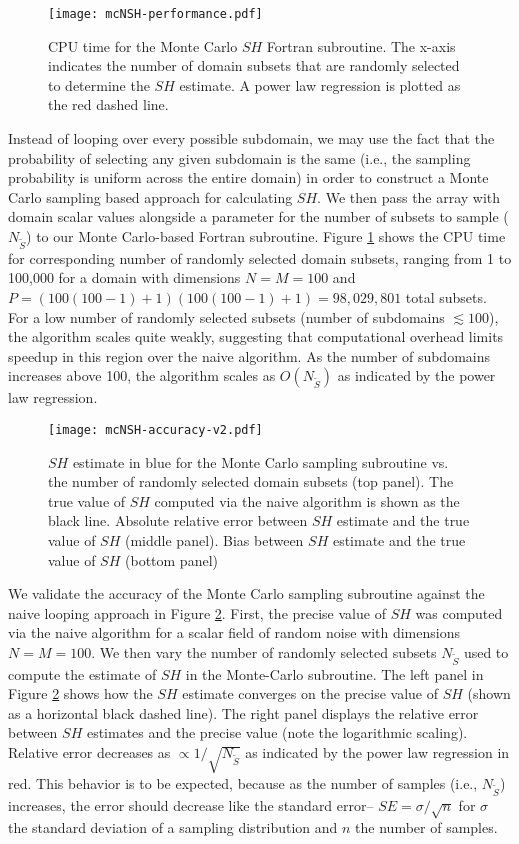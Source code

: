 \begin{figure}[h]
	\centering
	\texttt{[image: mcNSH-performance.pdf]}
	\caption{CPU time for the Monte Carlo $SH$ Fortran subroutine. The x-axis indicates the number of domain subsets that are randomly selected to determine the $SH$ estimate. A power law regression is plotted as the red dashed line.}
	\label{fig:mcsh-performance}
\end{figure}

Instead of looping over every possible subdomain, we may use the fact that the probability of selecting any given subdomain is the same (i.e., the sampling probability is uniform across the entire domain) in order to construct a Monte Carlo sampling based approach for calculating $SH$. We then pass the array with domain scalar values alongside a parameter for the number of subsets to sample ($N_{\tilde{S}}$) to our Monte Carlo-based Fortran subroutine. Figure \ref{fig:mcsh-performance} shows the CPU time for corresponding number of randomly selected domain subsets, ranging from 1 to 100,000 for a domain with dimensions $N=M=100$ and $P=(100(100-1)+1)(100(100-1)+1) = 98,029,801$ total subsets. For a low number of randomly selected subsets (number of subdomains $\lesssim 100$), the algorithm scales quite weakly, suggesting that computational overhead limits speedup in this region over the naive algorithm. As the number of subdomains increases above 100, the algorithm scales as $O(N_{\tilde{S}})$ as indicated by the power law regression.

\begin{figure}[h]
	\centering
	\texttt{[image: mcNSH-accuracy-v2.pdf]}
	\caption{$SH$ estimate in blue for the Monte Carlo sampling subroutine vs. the number of randomly selected domain subsets (top panel). The true value of $SH$ computed via the naive algorithm is shown as the black line.  Absolute relative error between $SH$ estimate and the true value of $SH$ (middle panel). Bias between $SH$ estimate and the true value of $SH$ (bottom panel) }
	\label{fig:mcsh-accuracy}
\end{figure}

We validate the accuracy of the Monte Carlo sampling subroutine against the naive looping approach in Figure \ref{fig:mcsh-accuracy}. First, the precise value of $SH$ was computed via the naive algorithm for a scalar field of random noise with dimensions $N=M=100$. We then vary the number of randomly selected subsets $N_{\tilde{S}}$ used to compute the estimate of $SH$ in the Monte-Carlo subroutine. The left panel in Figure \ref{fig:mcsh-accuracy} shows how the $SH$ estimate converges on the precise value of $SH$ (shown as a horizontal black dashed line). The right panel displays the relative error between $SH$ estimates and the precise value (note the logarithmic scaling). Relative error decreases as $\propto 1/\sqrt{N_{\tilde{S}}}$ as indicated by the power law regression in red. This behavior is to be expected, because as the number of samples (i.e., $N_{\tilde{S}}$) increases, the error should decrease like the standard error-- $SE = \sigma/\sqrt{n}$ for $\sigma$ the standard deviation of a sampling distribution and $n$ the number of samples.

